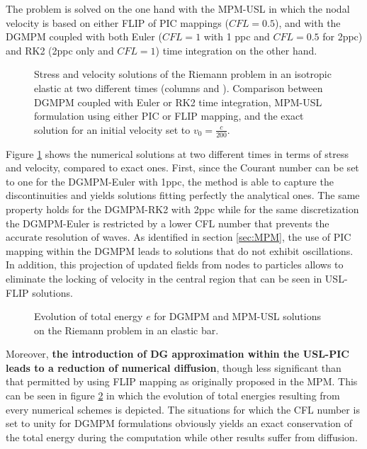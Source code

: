 The problem is solved on the one hand with the MPM-USL in which the nodal velocity is based on either FLIP of PIC mappings ($CFL=0.5$), and with the DGMPM coupled with both Euler ($CFL=1$ with 1 ppc and $CFL=0.5$ for 2ppc) and RK2 (2ppc only and $CFL=1$) time integration on the other hand.
\begin{figure}[h!]
  \centering
  { \label{subfig:rp_elastic1}}
  { \label{subfig:rp_elastic2}}
  
  \caption{Stress and velocity solutions of the Riemann problem in an isotropic elastic at two different times (columns  and ). Comparison between DGMPM coupled with Euler or RK2 time integration, MPM-USL formulation using either PIC or FLIP mapping, and the exact solution for an initial velocity set to $v_0=\frac{c}{200}$.}
  \label{fig:elastic_stress}
\end{figure}
Figure \ref{fig:elastic_stress} shows the numerical solutions at two different times in terms of stress and velocity, compared to exact ones. 
First, since the Courant number can be set to one for the DGMPM-Euler with 1ppc, the method is able to capture the discontinuities and yields solutions fitting perfectly the analytical ones. The same property holds for the DGMPM-RK2 with 2ppc while for the same discretization the DGMPM-Euler is restricted by a lower CFL number that prevents the accurate resolution of waves.
As identified in section \ref{sec:MPM}, the use of PIC mapping within the DGMPM leads to solutions that do not exhibit oscillations.
In addition, this projection of updated fields from nodes to particles allows to eliminate the locking of velocity in the central region that can be seen in USL-FLIP solutions.
\begin{figure}[h!]
  \centering
  
  \caption{Evolution of total energy $e$ for DGMPM and MPM-USL solutions on the Riemann problem in an elastic bar.}
  \label{fig:energy_elastic_RP}
\end{figure}
Moreover, \textbf{the introduction of DG approximation within the USL-PIC leads to a reduction of numerical diffusion}, though less significant than that permitted by using FLIP mapping as originally proposed in the MPM.
This can be seen in figure \ref{fig:energy_elastic_RP} in which the evolution of total energies resulting from every numerical schemes is depicted.
The situations for which the CFL number is set to unity for DGMPM formulations obviously yields an exact conservation of the total energy during the computation while other results suffer from diffusion.

